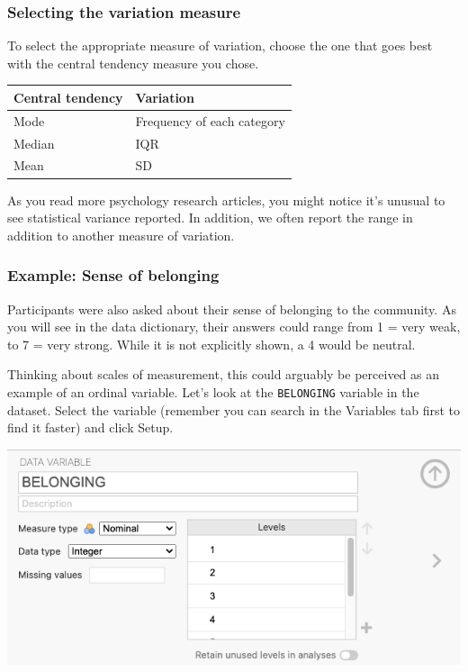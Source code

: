 \documentclass[
]{book}
\begin{document}
\hypertarget{selecting-the-variation-measure}{%
\subsubsection{Selecting the variation measure}\label{selecting-the-variation-measure}}

To select the appropriate measure of variation, choose the one that goes best with the central tendency measure you chose.

\begin{longtable}[]{@{}ll@{}}
\toprule\noalign{}
Central tendency & Variation \\
\midrule\noalign{}
\endhead
\bottomrule\noalign{}
\endlastfoot
Mode & Frequency of each category \\
Median & IQR \\
Mean & SD \\
\end{longtable}

As you read more psychology research articles, you might notice it's unusual to see statistical variance reported. In addition, we often report the range in addition to another measure of variation.

\hypertarget{example-sense-of-belonging}{%
\subsubsection{Example: Sense of belonging}\label{example-sense-of-belonging}}

Participants were also asked about their sense of belonging to the community. As you will see in the data dictionary, their answers could range from 1 = very weak, to 7 = very strong. While it is not explicitly shown, a 4 would be neutral.

Thinking about scales of measurement, this could arguably be perceived as an example of an ordinal variable. Let's look at the \texttt{BELONGING} variable in the dataset. Select the variable (remember you can search in the {Variables} tab first to find it faster) and click {Setup}.

\includegraphics{img/belongingsetup.png}
\end{document}

